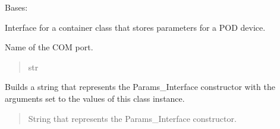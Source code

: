 \documentclass[letterpaper,10pt,english]{sphinxmanual}
\begin{document}

\begin{fulllineitems}
\label{\detokenize{Setup_PodParameters:Setup_PodParameters.Params_Interface}}
\pysigstartsignatures
{}
\pysigstopsignatures
\sphinxAtStartPar
Bases: 

\sphinxAtStartPar
Interface for a container class that stores parameters for a POD device.

\begin{fulllineitems}
\label{\detokenize{Setup_PodParameters:Setup_PodParameters.Params_Interface.port}}
\pysigstartsignatures
{}
\pysigstopsignatures
\sphinxAtStartPar
Name of the COM port.
\begin{quote}\begin{description}
\sphinxAtStartPar
str

\end{description}\end{quote}

\end{fulllineitems}


\begin{fulllineitems}
\label{\detokenize{Setup_PodParameters:Setup_PodParameters.Params_Interface.GetInit}}
\pysigstartsignatures
{}
\pysigstopsignatures
\sphinxAtStartPar
Builds a string that represents the Params\_Interface constructor with the         arguments set to the values of this class instance.
\begin{quote}\begin{description}
\sphinxAtStartPar
String that represents the Params\_Interface constructor.


\end{description}
\end{quote}
\end{fulllineitems}
\end{fulllineitems}
\end{document}
